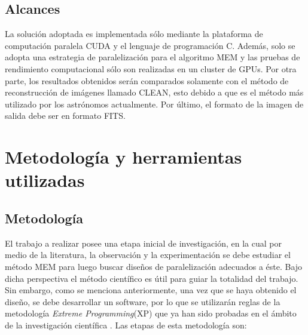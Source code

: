 \subsection{Alcances}
La solución adoptada es implementada sólo mediante la plataforma de computación paralela CUDA y el lenguaje de programación C. Además, solo se adopta una estrategia de paralelización  para el algoritmo MEM y las pruebas de rendimiento computacional sólo son realizadas en un cluster de GPUs. Por otra parte, los resultados obtenidos serán comparados solamente con el método de reconstrucción de imágenes llamado CLEAN, esto debido a que es el método más utilizado por los astrónomos actualmente. Por último, el formato de la imagen de salida debe ser en formato FITS. 


\section{Metodolog\'ia y herramientas utilizadas}
\label{intro:metodologia}

\subsection{Metodolog\'ia}
El trabajo a realizar posee una etapa inicial de investigación, en la cual por medio de la literatura, la observación y la experimentación se debe estudiar el método MEM  para luego buscar diseños de paralelización adecuados a éste. Bajo dicha perspectiva el método científico es útil para guiar la totalidad del trabajo. Sin embargo, como se menciona anteriormente, una vez que se haya obtenido el diseño, se debe desarrollar un software, por lo que se utilizarán reglas de la metodología \textit{Extreme Programming}(XP) que ya han sido probadas en el ámbito de la investigación científica \citep{xp}. Las etapas de esta metodología son:

